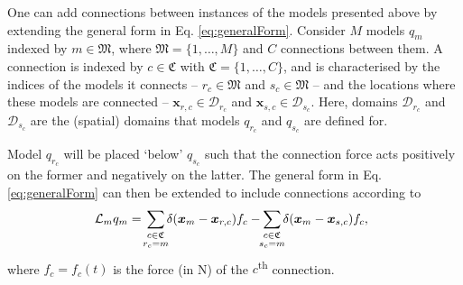 \documentclass{article}
\begin{document}

One can add connections between instances of the models presented above by extending the general form in Eq. \eqref{eq:generalForm}. Consider $M$ models $q_m$ indexed by $m \in \mathfrak{M}$, where $\mathfrak{M} = \{1, \hdots, M\}$ and $C$ connections between them. A connection is indexed by $c\in \mathfrak{C}$ with $\mathfrak{C} = \{1, \hdots, C\}$, and is characterised by the indices of the models it connects -- $r_c \in \mathfrak{M}$ and $s_c\in \mathfrak{M}$ -- and the locations where these models are connected -- $\boldsymbol{x}_{r, c}\in \mathcal{D}_{r_c}$ and $\boldsymbol{x}_{s, c}\in \mathcal{D}_{s_c}$. Here, domains $\mathcal{D}_{r_c}$ and $\mathcal{D}_{s_c}$ are the (spatial) domains that models $q_{r_c}$ and $q_{s_c}$ are defined for.  

Model $q_{r_c}$ will be placed `below' $q_{s_c}$ such that the connection force acts positively on the former and negatively on the latter. The general form in Eq. \eqref{eq:generalForm} can then be extended to include connections according to
\begin{equation}\label{eq:generalFormConnections}
    \!\!\!\mathcal{L}_mq_m =\!\sum_{\substack{c\in \mathfrak{C}\vspace{0.1em}\\ r_c = m}}\!\! \delta(\boldsymbol{x}_m - \boldsymbol{x}_{r, c}) f_c-\!\! \sum_{\substack{c\in \mathfrak{C}\vspace{0.1em}\\ s_c = m}}\!\! \delta(\boldsymbol{x}_m - \boldsymbol{x}_{s,c}) f_c,
\end{equation}
where $f_c = f_c(t)$ is the force (in N) of the $c$\textsuperscript{th} connection.
\end{document}
